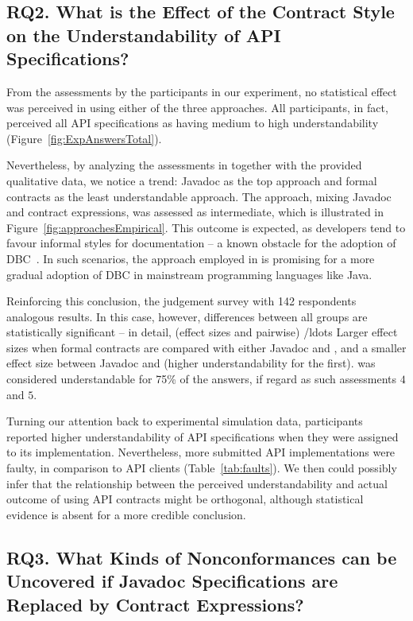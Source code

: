 \subsection{RQ2. What is the Effect of the Contract Style on the Understandability of API Specifications?}
\label{rq2}

From the assessments by the participants in our experiment, no statistical effect was perceived in using either of the three approaches. All participants, in fact, perceived all API specifications as having medium to high understandability (Figure~\ref{fig:ExpAnswersTotal}). 

Nevertheless, by analyzing the assessments in together with the provided qualitative data, we notice a trend: Javadoc as the top approach and formal contracts as the least understandable approach. The \contractjdoc{} approach, mixing Javadoc and contract expressions, was assessed as intermediate, which is illustrated in Figure~\ref{fig:approachesEmpirical}.
This outcome is expected, as developers tend to favour informal styles for documentation -- a known obstacle for the adoption of DBC~\cite{}. In such scenarios, the approach employed in \contractjdoc{} is promising for a more gradual adoption of DBC in mainstream programming languages like Java.

Reinforcing this conclusion, the judgement survey with 142 respondents analogous results. 
In this case, however, differences between all groups are statistically significant -- in detail, (effect sizes and pairwise) /ldots
Larger effect sizes when formal contracts are compared with either Javadoc and \contractjdoc{}, and a smaller effect size between Javadoc and \contractjdoc{} (higher understandability for the first).
\contractjdoc{} was considered understandable for 75\% of the answers, if regard as such assessments $4$ and $5$.

Turning our attention back to experimental simulation data, participants reported higher understandability of API specifications when they were assigned to its implementation. Nevertheless, more submitted API implementations were faulty, in comparison to API clients (Table~\ref{tab:faults}). 
We then could possibly infer that the relationship between the perceived understandability and actual outcome of using API contracts might be orthogonal, although statistical evidence is absent for a more credible conclusion. 


\subsection{RQ3. What Kinds of Nonconformances can be Uncovered if Javadoc Specifications are Replaced by Contract Expressions?}
\label{rq3}


